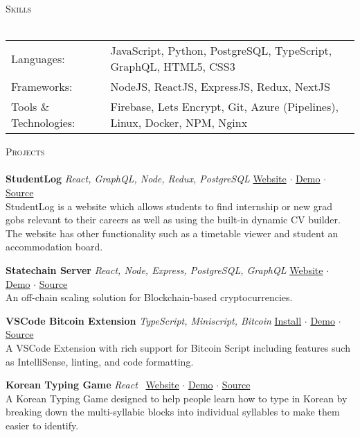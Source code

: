 \documentclass[a4paper]{article}
\newcommand{\lineunder} {
    \vspace*{-8pt} \\
    \hspace*{-18pt} \hrulefill \\
}
\newcommand{\header} [1] {
    {\hspace*{-18pt}\vspace*{6pt} \textsc{#1}}
    \vspace*{-6pt} \lineunder
}
\begin{document}
\header{Skills}
\begin{tabular}{ l l }
	Languages: & JavaScript, Python, PostgreSQL, TypeScript, GraphQL, HTML5, CSS3  \\
	Frameworks:                   & NodeJS, ReactJS, ExpressJS, Redux, NextJS             \\
	Tools \& Technologies: & Firebase, Lets Encrypt, Git, Azure (Pipelines), Linux, Docker, NPM, Nginx \\
\end{tabular}
\vspace{2mm}

\header{Projects}

{\textbf{StudentLog}} {\sl React, GraphQL, Node, Redux, PostgreSQL} \hfill \href{https://studentlog.io}{Website} $\cdot$ \href{https://www.youtube.com/watch?v=j8Ma9xcLlm0}{Demo} $\cdot$ \href{https://github.com/Kelbie/student-log}{Source}\\
StudentLog is a website which allows students to find internship or new grad gobs relevant to their careers as well as using the built-in dynamic CV builder. The website has other functionality such as a timetable viewer and student an accommodation board.\\
\vspace*{2mm}

{\textbf{Statechain Server}} {\sl React, Node, Express, PostgreSQL, GraphQL} \hfill \href{https://statechain.info}{Website} $\cdot$ \href{https://www.youtube.com/watch?v=3tdQJ4k8goE}{Demo} $\cdot$ \href{https://statechain.info}{Source}\\
An off-chain scaling solution for Blockchain-based cryptocurrencies.\\
\vspace*{2mm}

{\textbf{VSCode Bitcoin Extension}} {\sl TypeScript, Miniscript, Bitcoin} \hfill \href{https://bitcoin-vscode.kelbie.dev}{Install} $\cdot$ \href{https://bitcoin-vscode.kelbie.dev}{Demo} $\cdot$ \href{https://github.com/Kelbie/vscode-bitcoin}{Source}\\
A VSCode Extension with rich support for Bitcoin Script including features such as IntelliSense, linting, and code formatting.\
\vspace*{2mm}

{\textbf{Korean Typing Game}} {\sl React} \hfill \href{https://hangul.kelbie.dev}{Website} $\cdot$ \href{https://bitcoin-vscode.kelbie.dev}{Demo} $\cdot$  \href{https://bitcoin-vscode.kelbie.dev}{Source}\\
A Korean Typing Game designed to help people learn how to type in Korean by breaking down the multi-syllabic blocks into individual syllables to make them easier to identify.\
\vspace*{2mm}
\end{document}
